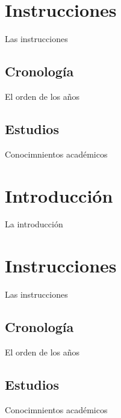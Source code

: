 \documentclass[30pt,a4paper]{article}
\begin{document}
  \section{Instrucciones}
    Las instrucciones
    \subsection{Cronología}
      El orden de los años
    \subsection{Estudios}
      Conocimnientos académicos
  \section{Introducción}
    La introducción
  \section{Instrucciones}
    Las instrucciones
    \subsection{Cronología}
      El orden de los años
    \subsection{Estudios}
      Conocimnientos académicos
\end{document}
